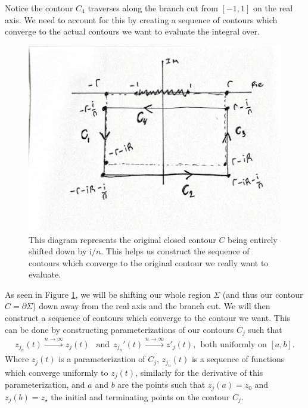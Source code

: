 \documentclass[10pt]{amsart}
\newcommand{\I}{\mathrm{i}}
\theoremstyle{nonumberplain}
\begin{document}
\begin{enumerate}[label={\bf {\arabic*}:}]
\begin{itemize}
Notice the contour $C_4$ traverses along the branch cut from $[-1, 1]$ on the real axis.
We need to account for this by creating a sequence of contours which converge to the actual contours we want to evaluate the integral over. \\
\begin{figure}[h]
	\centering
	\includegraphics{five-part-one-sequence}
	\caption{
		This diagram represents the original closed contour $C$ being entirely shifted down by $\I / n$.
		This helps us construct the sequence of contours which converge to the original contour we really want to evaluate.
	}\label{fig:f2}
\end{figure}

\noindent
As seen in Figure \ref{fig:f2}, we will be shifting our whole region $\Sigma$ (and thus our contour $C = \partial \Sigma$) down away from the real axis and the branch cut.
We will then construct a sequence of contours which converge to the contour we want.
This can be done by constructing parameterizations of our contours $C_j$ such that 
\begin{align*}
	z_{j_n}(t) \overset{n \to \infty}{\longrightarrow} z_j(t)  \:\: \text{ and} \:\:
	z_{j_n}'(t) \overset{n \to \infty}{\longrightarrow} z'_j(t), \:\: \text{both uniformly on } [a,b].
\end{align*}
Where $z_j(t)$ is a parameterization of $C_j$, $z_{j_n}(t)$ is a sequence of functions which converge uniformly to $z_j(t)$, similarly for the derivative of this parameterization, and $a$ and $b$ are the points such that $z_j(a) = z_0$ and $z_j(b) = z_{\star}$ the initial and terminating points on the contour $C_j$. \\


\end{itemize}
\end{enumerate}
\end{document}
